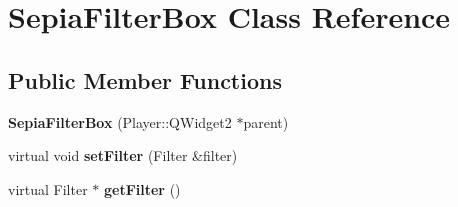 \hypertarget{classSepiaFilterBox}{}\section{Sepia\+Filter\+Box Class Reference}
\label{classSepiaFilterBox}
\subsection*{Public Member Functions}
\begin{DoxyCompactItemize}
\item 
\hypertarget{classSepiaFilterBox_a4c1a90b0cc6f018884a5916f837e791b}{}{\bfseries Sepia\+Filter\+Box} (Player\+::\+Q\+Widget2 $\ast$parent)\label{classSepiaFilterBox_a4c1a90b0cc6f018884a5916f837e791b}

\item 
\hypertarget{classSepiaFilterBox_a09e99b0db09b8468ce7d7e0f98293ac5}{}virtual void {\bfseries set\+Filter} (Filter \&filter)\label{classSepiaFilterBox_a09e99b0db09b8468ce7d7e0f98293ac5}

\item 
\hypertarget{classSepiaFilterBox_ad7b14770615490d1445c958c79fd3adb}{}virtual Filter $\ast$ {\bfseries get\+Filter} ()\label{classSepiaFilterBox_ad7b14770615490d1445c958c79fd3adb}

\end{DoxyCompactItemize}
